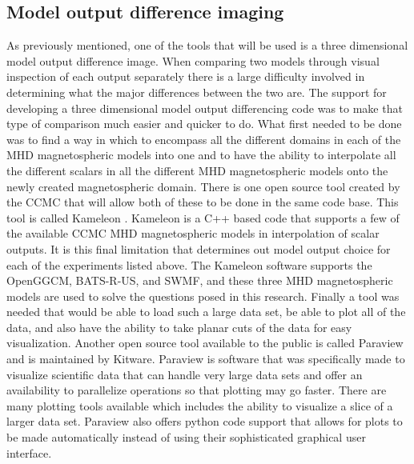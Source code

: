 \subsection{Model output difference imaging}
As previously mentioned, one of the tools that will be used is a three
dimensional model output difference image. When comparing two models through
visual inspection of each output separately there is a large difficulty involved
in determining what the major differences between the two are. The support for
developing a three dimensional model output differencing code was to make that
type of comparison much easier and quicker to do. What first needed to be done
was to find a way in which to encompass all the different domains in each of the
MHD magnetospheric models into one and to have the ability to interpolate all
the different scalars in all the different MHD magnetospheric models onto the
newly created magnetospheric domain. There is one open source tool created by
the CCMC that will allow both of these to be done in the same code base. This
tool is called Kameleon \cite{Kameleon}. Kameleon is a C++ based code that
supports a few of the available CCMC MHD magnetospheric models in interpolation
of scalar outputs. It is this final limitation that determines out model output
choice for each of the experiments listed above. The Kameleon software supports
the OpenGGCM, BATS-R-US, and SWMF, and these three MHD magnetospheric models are
used to solve the questions posed in this research. Finally a tool was needed
that would be able to load such a large data set, be able to plot all of the
data, and also have the ability to take planar cuts of the data for easy
visualization. Another open source tool available to the public is called
Paraview \cite{Paraview} and is maintained by Kitware. Paraview is software that
was specifically made to visualize scientific data that can handle very large data
sets and offer an availability to parallelize operations so that plotting may go
faster. There are many plotting tools available which includes the ability to
visualize a slice of a larger data set. Paraview also offers python code support
that allows for plots to be made automatically instead of using their
sophisticated graphical user interface.
